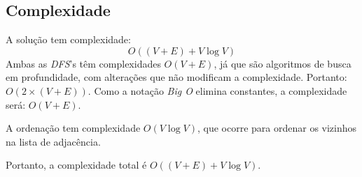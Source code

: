 \documentclass[12pt, letterpaper]{article}
\begin{document}
        \subsection{Complexidade}
            A solução tem complexidade:
            $$ O((V + E) + V\log{V}) $$
            Ambas as \emph{DFS}'s têm complexidades $O(V + E)$, já que são algoritmos de busca em profundidade, com alterações que não modificam a complexidade. Portanto: $O(2 \times (V + E))$. Como a notação \emph{Big O} elimina constantes, a complexidade será: $O(V + E)$.

            A ordenação tem complexidade $O(V\log{V})$, que ocorre para ordenar os vizinhos na lista de adjacência.

            Portanto, a complexidade total é $O((V + E) + V\log{V})$.
\end{document}
